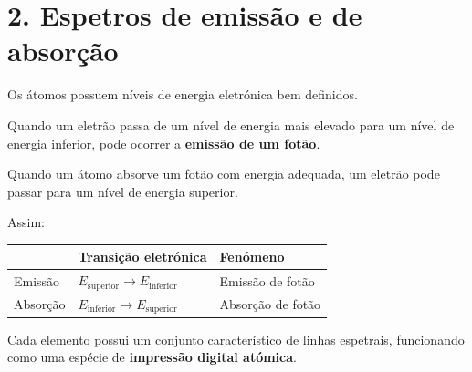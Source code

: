 \documentclass[11pt,a4paper]{article}
\begin{document}
	
	\newpage
	
	\section*{\textcolor{eublue}{2. Espetros de emissão e de absorção}}
	
	\begin{recorda}
		
		Os átomos possuem níveis de energia eletrónica bem definidos.
		
		Quando um eletrão passa de um nível de energia mais elevado para um
		nível de energia inferior, pode ocorrer a \textbf{emissão de um fotão}.
		
		Quando um átomo absorve um fotão com energia adequada, um eletrão pode
		passar para um nível de energia superior.
		
		Assim:
		
		\begin{center}
			\begin{tabular}{lll}
				\toprule
				& \textbf{Transição eletrónica} & \textbf{Fenómeno}\\
				\midrule
				Emissão &
				\(E_{\text{superior}}\rightarrow E_{\text{inferior}}\)
				&
				Emissão de fotão
				\\
				
				Absorção &
				\(E_{\text{inferior}}\rightarrow E_{\text{superior}}\)
				&
				Absorção de fotão
				\\
				\bottomrule
			\end{tabular}
		\end{center}
		
		Cada elemento possui um conjunto característico de linhas espetrais,
		funcionando como uma espécie de \textbf{impressão digital atómica}.
		
	\end{recorda}
	
	
\end{document}
